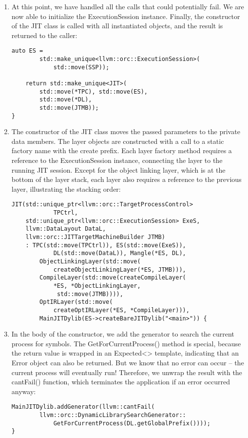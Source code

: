 \begin{enumerate}
\item At this point, we have handled all the calls that could potentially fail. We are now able to initialize the ExecutionSession instance. Finally, the constructor of the JIT class is called with all instantiated objects, and the result is returned to the caller:
\begin{lstlisting}[caption={}]
	auto ES =
		std::make_unique<llvm::orc::ExecutionSession>(
			std::move(SSP));
	
	return std::make_unique<JIT>(
		std::move(*TPC), std::move(ES),
		std::move(*DL),
		std::move(JTMB));
}
\end{lstlisting}

\item The constructor of the JIT class moves the passed parameters to the private data members. The layer objects are constructed with a call to a static factory name with the create prefix. Each layer factory method requires a reference to the ExecutionSession instance, connecting the layer to the running JIT session. Except for the object linking layer, which is at the bottom of the layer stack, each layer also requires a reference to the previous layer, illustrating the stacking order:
\begin{lstlisting}[caption={}]
	JIT(std::unique_ptr<llvm::orc::TargetProcessControl>
			TPCtrl,
	std::unique_ptr<llvm::orc::ExecutionSession> ExeS,
	llvm::DataLayout DataL,
	llvm::orc::JITTargetMachineBuilder JTMB)
	: TPC(std::move(TPCtrl)), ES(std::move(ExeS)),
			DL(std::move(DataL)), Mangle(*ES, DL),
		ObjectLinkingLayer(std::move(
			createObjectLinkingLayer(*ES, JTMB))),
		CompileLayer(std::move(createCompileLayer(
			*ES, *ObjectLinkingLayer,
			 std::move(JTMB)))),
		OptIRLayer(std::move(
			createOptIRLayer(*ES, *CompileLayer))),
		MainJITDylib(ES->createBareJITDylib("<main>")) {
\end{lstlisting}

\item In the body of the constructor, we add the generator to search the current process for symbols. The GetForCurrentProcess() method is special, because the return value is wrapped in an Expected<> template, indicating that an Error object can also be returned. But we know that no error can occur – the current process will eventually run! Therefore, we unwrap the result with the cantFail() function, which terminates the application if an error occurred anyway:
\begin{lstlisting}[caption={}]
	MainJITDylib.addGenerator(llvm::cantFail(
		llvm::orc::DynamicLibrarySearchGenerator::
			GetForCurrentProcess(DL.getGlobalPrefix())));
}
\end{lstlisting}


\end{enumerate}

